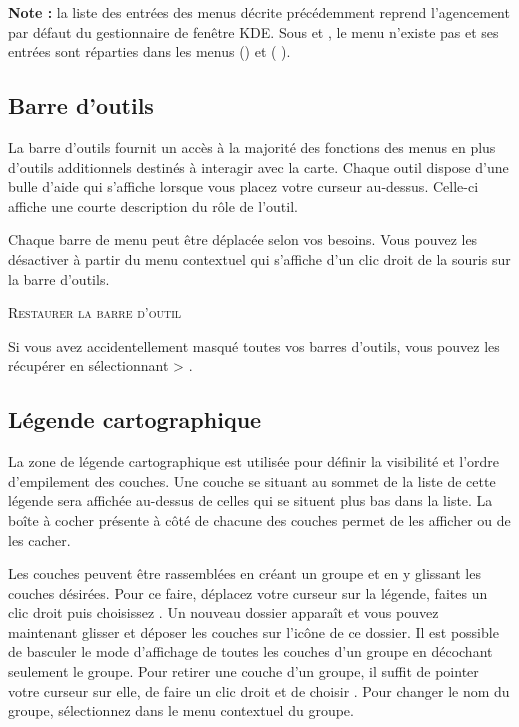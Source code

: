 \textbf{Note : } la liste des entrées des menus décrite précédemment reprend l'agencement par défaut du gestionnaire de fenêtre KDE. Sous \osx{} et , le menu  n'existe pas et ses entrées sont réparties dans les menus  (\osx{}) et  (\osx{} \nix{}).

\subsection{Barre d'outils} \label{label_toolbars}

La barre d'outils fournit un accès à la majorité des fonctions des menus en plus d'outils additionnels destinés à interagir avec la carte. Chaque outil dispose d'une bulle d'aide qui s'affiche lorsque vous placez votre curseur au-dessus. Celle-ci affiche une courte description du rôle de l'outil.

Chaque barre de menu peut être déplacée selon vos besoins. Vous pouvez les désactiver à partir du menu contextuel qui s'affiche d'un clic droit de la souris sur la barre d'outils.

\begin{Tip}
\caption{\textsc{Restaurer la barre d'outil}} 
Si vous avez accidentellement masqué toutes vos barres d'outils, vous pouvez les récupérer en sélectionnant  > .
\end{Tip}

\subsection{Légende cartographique} \label{label_legend}

La zone de légende cartographique est utilisée pour définir la visibilité et l'ordre d'empilement des couches. Une couche se situant au sommet de la liste de cette légende sera affichée au-dessus de celles qui se situent plus bas dans la liste. La boîte à cocher présente à côté de chacune des couches permet de les afficher ou de les cacher.

Les couches peuvent être rassemblées en créant un groupe et en y glissant les couches désirées. Pour ce faire, déplacez votre curseur sur la légende, faites un clic droit puis choisissez . Un nouveau dossier apparaît et vous pouvez maintenant glisser et déposer les couches sur l'icône de ce dossier. Il est possible de basculer le mode d'affichage de toutes les couches d'un groupe en décochant seulement le groupe. Pour retirer une couche d'un groupe, il suffit de pointer votre curseur sur elle, de faire un clic droit et de choisir . Pour changer le nom du groupe, sélectionnez  dans le menu contextuel du groupe.

